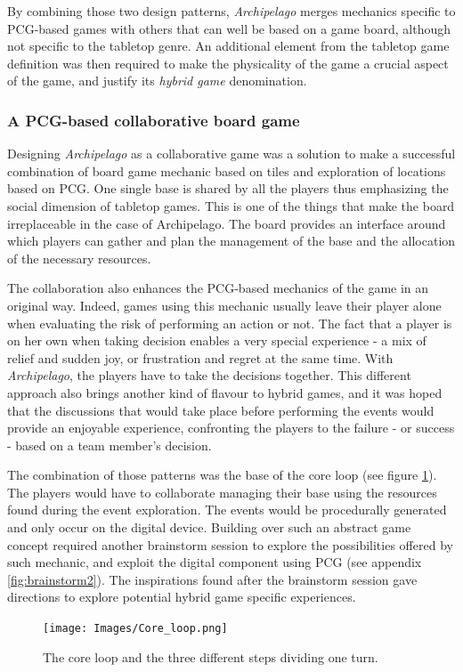By combining those two design patterns, \textit{Archipelago} merges mechanics specific to PCG-based games with others that can well be based on a game board, although not specific to the tabletop genre. An additional element from the tabletop game definition was then required to make the physicality of the game a crucial aspect of the game, and justify its \textit{hybrid game} denomination.

\subsubsection{A PCG-based collaborative board game}

Designing \textit{Archipelago} as a collaborative game was a solution to make a successful combination of board game mechanic based on tiles and exploration of locations based on PCG. One single base is shared by all the players thus emphasizing the social dimension of tabletop games. This is one of the things that make the board irreplaceable in the case of Archipelago. The board provides an interface around which players can gather and plan the management of the base and the allocation of the necessary resources.

The collaboration also enhances the PCG-based mechanics of the game in an original way. Indeed, games using this mechanic usually leave their player alone when evaluating the risk of performing an action or not. The fact that a player is on her own when taking decision enables a very special experience - a mix of relief and sudden joy, or frustration and regret at the same time. With \textit{Archipelago}, the players have to take the decisions together. This different approach also brings another kind of flavour to hybrid games, and it was hoped that the discussions that would take place before performing the events would provide an enjoyable experience, confronting the players to the failure - or success - based on a team member's decision.

The combination of those patterns was the base of the core loop (see figure \ref{fig:loop}). The players would have to collaborate managing their base using the resources found during the event exploration. The events would be procedurally generated and only occur on the digital device. Building over such an abstract game concept required another brainstorm session to explore the possibilities offered by such mechanic, and exploit the digital component using PCG (see appendix \ref{fig:brainstorm2}). The inspirations found after the brainstorm session gave directions to explore potential hybrid game specific experiences.
\begin{figure}[!ht]
    \centering
    \texttt{[image: Images/Core\_loop.png]}
    \caption{The core loop and the three different steps dividing one turn.}
    \label{fig:loop}
\end{figure}
